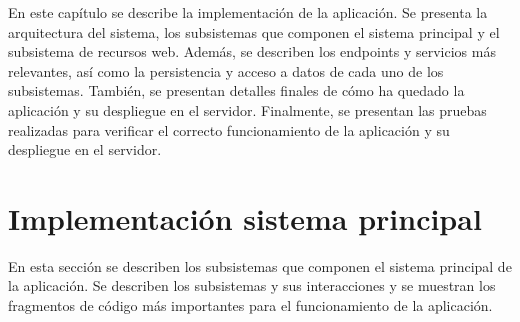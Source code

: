 
En este capítulo se describe la implementación de la aplicación. Se presenta la arquitectura del sistema, los subsistemas que componen el sistema principal y el subsistema de recursos web. Además, se describen los endpoints y servicios más relevantes, así como la persistencia y acceso a datos de cada uno de los subsistemas. También, se presentan detalles finales de cómo ha quedado la aplicación y su despliegue en el servidor. Finalmente, se presentan las pruebas realizadas para verificar el correcto funcionamiento de la aplicación y su despliegue en el servidor.
\section{Implementación sistema principal}\label{ch:im}
En esta sección se describen los subsistemas que componen el sistema principal de la aplicación. Se describen los subsistemas y sus interacciones y se muestran los fragmentos de código más importantes para el funcionamiento de la aplicación.
